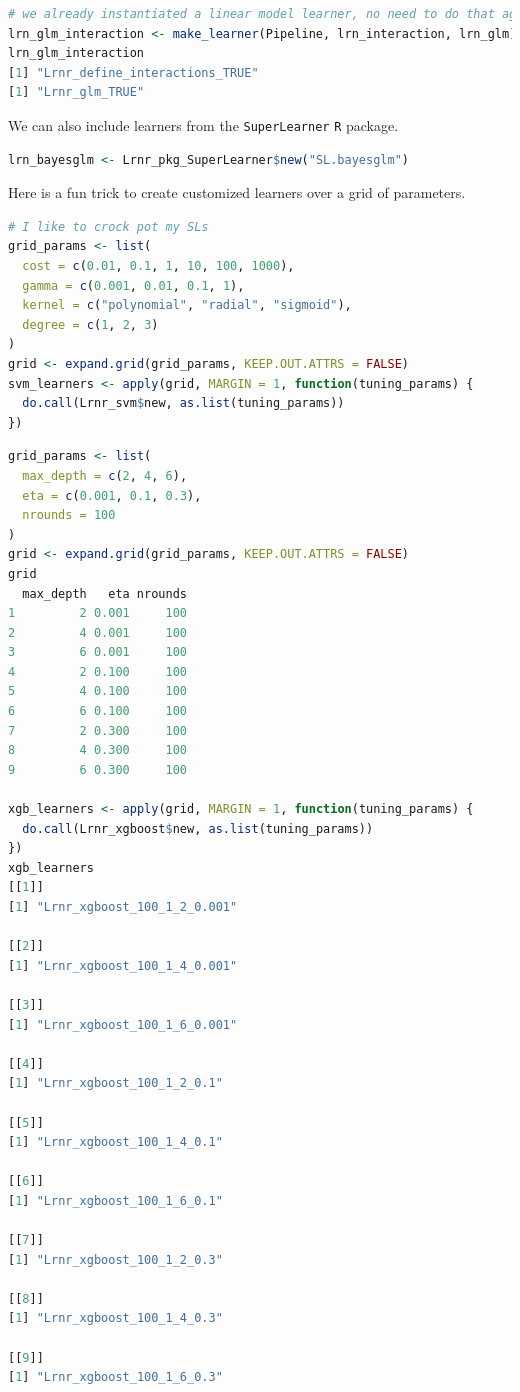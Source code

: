 \documentclass[
  12pt, krantz2,
]{krantz}
\newcommand{\passthrough}[1]{#1}
\theoremstyle{definition}
\theoremstyle{definition}
\theoremstyle{definition}
\newcommand{\1}{\mathbbm{1}}
\begin{document}
\begin{lstlisting}[language=R]
# we already instantiated a linear model learner, no need to do that again
lrn_glm_interaction <- make_learner(Pipeline, lrn_interaction, lrn_glm)
lrn_glm_interaction
[1] "Lrnr_define_interactions_TRUE"
[1] "Lrnr_glm_TRUE"
\end{lstlisting}

We can also include learners from the \passthrough{\lstinline!SuperLearner!} \passthrough{\lstinline!R!} package.

\begin{lstlisting}[language=R]
lrn_bayesglm <- Lrnr_pkg_SuperLearner$new("SL.bayesglm")
\end{lstlisting}

Here is a fun trick to create customized learners over a grid of parameters.

\begin{lstlisting}[language=R]
# I like to crock pot my SLs
grid_params <- list(
  cost = c(0.01, 0.1, 1, 10, 100, 1000),
  gamma = c(0.001, 0.01, 0.1, 1),
  kernel = c("polynomial", "radial", "sigmoid"),
  degree = c(1, 2, 3)
)
grid <- expand.grid(grid_params, KEEP.OUT.ATTRS = FALSE)
svm_learners <- apply(grid, MARGIN = 1, function(tuning_params) {
  do.call(Lrnr_svm$new, as.list(tuning_params))
})
\end{lstlisting}

\begin{lstlisting}[language=R]
grid_params <- list(
  max_depth = c(2, 4, 6),
  eta = c(0.001, 0.1, 0.3),
  nrounds = 100
)
grid <- expand.grid(grid_params, KEEP.OUT.ATTRS = FALSE)
grid
  max_depth   eta nrounds
1         2 0.001     100
2         4 0.001     100
3         6 0.001     100
4         2 0.100     100
5         4 0.100     100
6         6 0.100     100
7         2 0.300     100
8         4 0.300     100
9         6 0.300     100

xgb_learners <- apply(grid, MARGIN = 1, function(tuning_params) {
  do.call(Lrnr_xgboost$new, as.list(tuning_params))
})
xgb_learners
[[1]]
[1] "Lrnr_xgboost_100_1_2_0.001"

[[2]]
[1] "Lrnr_xgboost_100_1_4_0.001"

[[3]]
[1] "Lrnr_xgboost_100_1_6_0.001"

[[4]]
[1] "Lrnr_xgboost_100_1_2_0.1"

[[5]]
[1] "Lrnr_xgboost_100_1_4_0.1"

[[6]]
[1] "Lrnr_xgboost_100_1_6_0.1"

[[7]]
[1] "Lrnr_xgboost_100_1_2_0.3"

[[8]]
[1] "Lrnr_xgboost_100_1_4_0.3"

[[9]]
[1] "Lrnr_xgboost_100_1_6_0.3"
\end{lstlisting}
\end{document}
